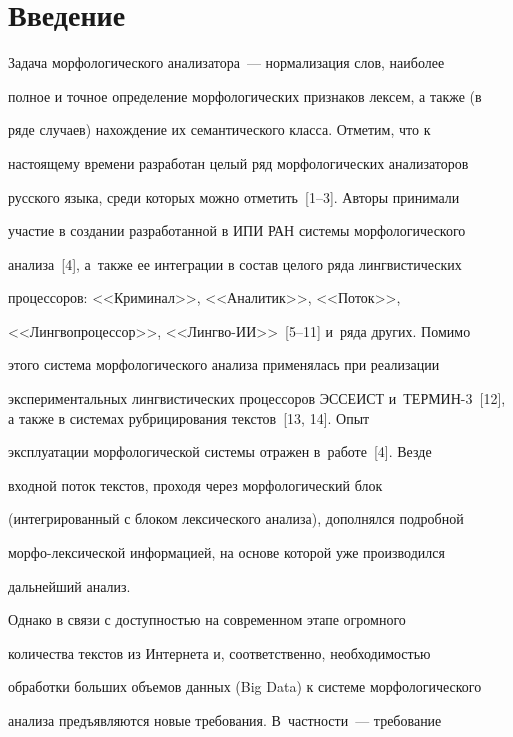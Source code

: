       \thispagestyle{headings}





    \section{Введение}



    Задача морфологического анализатора~--- нормализация слов, наиболее

полное и точное определение морфологических признаков лексем, а также (в

ряде случаев) нахождение их семантического класса. Отметим, что к

настоящему времени разработан целый ряд морфологических анализаторов

русского языка, среди которых можно отметить~[1--3]. Авторы принимали

участие в создании разработанной в ИПИ РАН системы морфологического

анализа~[4], а~также ее интеграции в состав целого ряда лингвистических

процессоров: <<Криминал>>, <<Аналитик>>, <<Поток>>,

<<Лингвопроцессор>>, <<Лингво-ИИ>>~[5--11] и~ряда других. Помимо

этого система морфологического анализа применялась при реализации

экспериментальных лингвистических процессоров ЭССЕИСТ и~\mbox{ТЕРМИН-3}~[12], а также в системах рубрицирования текстов~[13, 14]. Опыт

эксплуатации морфологической системы отражен в~работе~[4]. Везде

входной поток текстов, проходя через морфологический блок

(интегрированный с блоком лексического анализа), дополнялся подробной

морфо-лексической информацией, на основе которой уже производился

дальнейший анализ.



    Однако в связи с доступностью на современном этапе огромного

количества текстов из Интернета и, соответственно, необходимостью

обработки больших объемов данных (Big Data) к системе морфологического

анализа предъявляются новые требования. В~частности~--- требование

